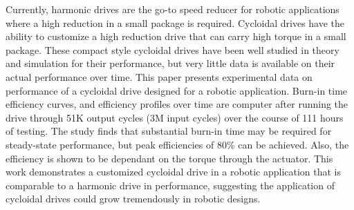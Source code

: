 Currently, harmonic drives are the go-to speed reducer for robotic applications where a high reduction in a small package is required. 
Cycloidal drives have the ability to customize a high reduction drive that can carry high torque in a small package. 
These compact style cycloidal drives have been well studied in theory and simulation for their performance, but very little data is available on their actual performance over time. 
This paper presents experimental data on performance of a cycloidal drive designed for a robotic application. 
Burn-in time efficiency curves, and efficiency profiles over time are computer after running the drive through 51K output cycles (3M input cycles) over the course of 111 hours of testing. 
The study finds that substantial burn-in time may be required for steady-state performance, but peak efficiencies of 80\% can be achieved. 
Also, the efficiency is shown to be dependant on the torque through the actuator.
This work demonstrates a customized cycloidal drive in a robotic application that is comparable to a harmonic drive in performance, suggesting the application of cycloidal drives could grow tremendously in robotic designs. 